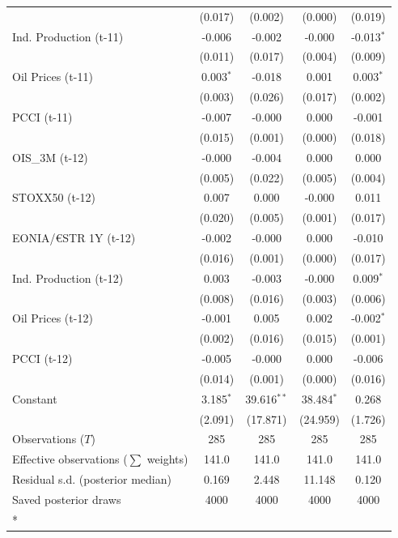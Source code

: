 \begin{longtable}[t]{lcccc}
 & (0.017) & (0.002) & (0.000) & (0.019)\\
Ind. Production (t-11) & -0.006 & -0.002 & -0.000 & -0.013$^{*}$\\
 & (0.011) & (0.017) & (0.004) & (0.009)\\
Oil Prices (t-11) & 0.003$^{*}$ & -0.018 & 0.001 & 0.003$^{*}$\\
 & (0.003) & (0.026) & (0.017) & (0.002)\\
PCCI (t-11) & -0.007 & -0.000 & 0.000 & -0.001\\
 & (0.015) & (0.001) & (0.000) & (0.018)\\
OIS\_3M (t-12) & -0.000 & -0.004 & 0.000 & 0.000\\
 & (0.005) & (0.022) & (0.005) & (0.004)\\
STOXX50 (t-12) & 0.007 & 0.000 & -0.000 & 0.011\\
 & (0.020) & (0.005) & (0.001) & (0.017)\\
EONIA/€STR 1Y (t-12) & -0.002 & -0.000 & 0.000 & -0.010\\
 & (0.016) & (0.001) & (0.000) & (0.017)\\
Ind. Production (t-12) & 0.003 & -0.003 & -0.000 & 0.009$^{*}$\\
 & (0.008) & (0.016) & (0.003) & (0.006)\\
Oil Prices (t-12) & -0.001 & 0.005 & 0.002 & -0.002$^{*}$\\
 & (0.002) & (0.016) & (0.015) & (0.001)\\
PCCI (t-12) & -0.005 & -0.000 & 0.000 & -0.006\\
 & (0.014) & (0.001) & (0.000) & (0.016)\\
Constant & 3.185$^{*}$ & 39.616$^{**}$ & 38.484$^{*}$ & 0.268\\
 & (2.091) & (17.871) & (24.959) & (1.726)\\
\midrule
Observations ($T$) & 285 & 285 & 285 & 285\\
Effective observations ($\sum$ weights) & 141.0 & 141.0 & 141.0 & 141.0\\
Residual s.d. (posterior median) & 0.169 & 2.448 & 11.148 & 0.120\\
Saved posterior draws & 4000 & 4000 & 4000 & 4000\\*
\end{longtable}
\endgroup{}

\begingroup\fontsize{7}{9}\selectfont

